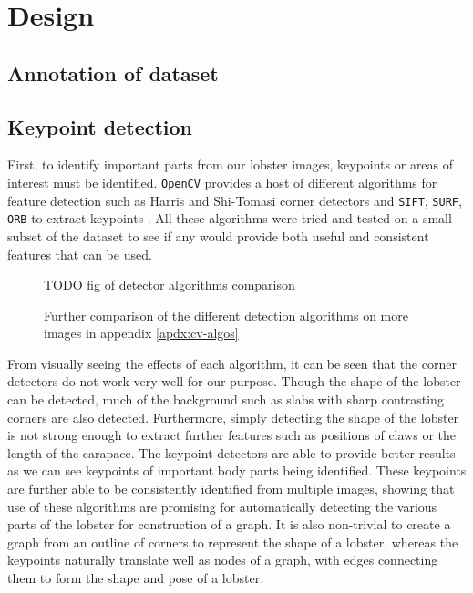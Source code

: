 \section{Design}

\vspace{1cm}
\subsection{Annotation of dataset}

\subsection{Keypoint detection}
First, to identify important parts from our lobster images, keypoints or areas of interest must be identified. \texttt{OpenCV} provides a host of different algorithms for feature detection such as Harris and Shi-Tomasi corner detectors and \texttt{SIFT}, \texttt{SURF}, \texttt{ORB} to extract keypoints \cite{opencv-tut1}. All these algorithms were tried and tested on a small subset of the dataset to see if any would provide both useful and consistent features that can be used. 

\begin{figure}[H]
\centering
TODO fig of detector algorithms comparison
\caption{Further comparison of the different detection algorithms on more images in appendix \ref{apdx:cv-algos}}
\end{figure}
\noindent

From visually seeing the effects of each algorithm, it can be seen that the corner detectors do not work very well for our purpose. Though the shape of the lobster can be detected, much of the background such as slabs with sharp contrasting corners are also detected. Furthermore, simply detecting the shape of the lobster is not strong enough to extract further features such as positions of claws or the length of the carapace. 
\n
The keypoint detectors are able to provide better results as we can see keypoints of important body parts being identified. These keypoints are further able to be consistently identified from multiple images, showing that use of these algorithms are promising for automatically detecting the various parts of the lobster for construction of a graph. It is also non-trivial to create a graph from an outline of corners to represent the shape of a lobster, whereas the keypoints naturally translate well as nodes of a graph, with edges connecting them to form the shape and pose of a lobster. 


